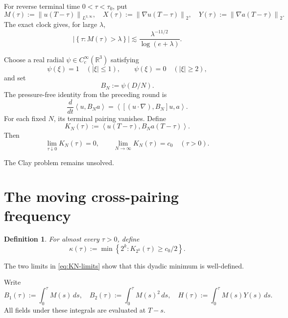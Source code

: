 \documentclass[11pt]{article}
\newtheorem{definition}[theorem]{Definition}
\theoremstyle{remark}
\newcommand{\R}{\mathbb R}
\newcommand{\norm}[1]{\left\|#1\right\|}
\newcommand{\ip}[2]{\left\langle#1,#2\right\rangle}
\begin{document}
For reverse terminal time \(0<\tau<\tau_0\), put
\begin{equation}
\label{eq:MXY}
 M(\tau):=\norm{u(T-\tau)}_{L^{3,\infty}},
 \quad
 X(\tau):=\norm{\nabla u(T-\tau)}_2,
 \quad
 Y(\tau):=\norm{\nabla a(T-\tau)}_2.
\end{equation}
The exact clock gives, for large \(\lambda\),
\begin{equation}
\label{eq:clock}
 \left|
 \left\{\tau:M(\tau)>\lambda\right\}
 \right|
 \lesssim
 \frac{\lambda^{-11/2}}{\log(e+\lambda)}.
\end{equation}

Choose a real radial
\(\psi\in C_c^\infty(\R^3)\) satisfying
\[
 \psi(\xi)=1\quad(|\xi|\leq1),
 \qquad
 \psi(\xi)=0\quad(|\xi|\geq2),
\]
and set
\[
 B_N:=\psi(D/N).
\]
The pressure-free identity from the preceding round is
\begin{equation}
\label{eq:comm-identity}
 \frac d{dt}\ip{u}{B_Na}
 =
 \ip{[(u\cdot\nabla),B_N]u}{a}.
\end{equation}
For each fixed \(N\), its terminal pairing vanishes.  Define
\begin{equation}
\label{eq:KN}
 K_N(\tau)
 :=
 \ip{u(T-\tau)}{B_Na(T-\tau)}.
\end{equation}
Then
\begin{equation}
\label{eq:KN-limits}
 \lim_{\tau\downarrow0}K_N(\tau)=0,
 \qquad
 \lim_{N\to\infty}K_N(\tau)=c_0
 \quad(\tau>0).
\end{equation}

The Clay problem remains unsolved.

\section{The moving cross-pairing frequency}

\begin{definition}
\label{def:kappa}
For almost every \(\tau>0\), define
\begin{equation}
\label{eq:kappa}
 \boxed{
 \kappa(\tau)
 :=
 \min
 \left\{
 2^k:K_{2^k}(\tau)\geq c_0/2
 \right\}.
 }
\end{equation}
\end{definition}

The two limits in \eqref{eq:KN-limits} show that this dyadic minimum is
well-defined.

Write
\begin{equation}
\label{eq:B1B2H}
 B_1(\tau):=\int_0^\tau M(s)\,ds,
 \quad
 B_2(\tau):=\int_0^\tau M(s)^2\,ds,
 \quad
 H(\tau):=\int_0^\tau M(s)Y(s)\,ds.
\end{equation}
All fields under these integrals are evaluated at \(T-s\).
\end{document}
